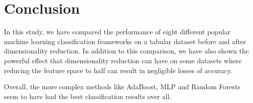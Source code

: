 \documentclass[journal,onecolumn]{IEEEtran}
\begin{document}
%


\section{Conclusion}
In this study, we have compared the performance of eight different popular machine learning classification frameworks 
on a tabular dataset before and after dimensionality reduction. In addition to this comparison, we have also shown the powerful
effect that dimensionality reduction can have on some datasets where reducing the feature space to half can result in negligible losses
of accuracy. 

Overall, the more complex methods like AdaBoost, MLP and Random Forests seem to have had the best classification results over all.
\end{document}
